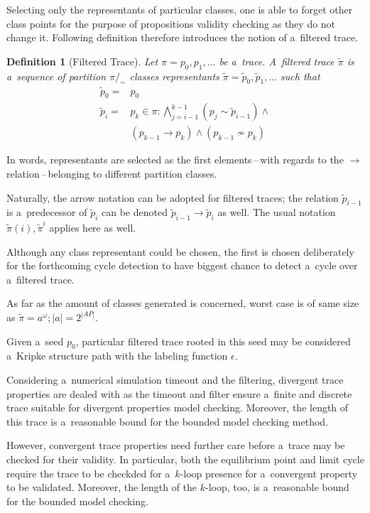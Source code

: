 \documentclass[12pt,twoside,draft]{fithesis}
\newtheorem{mydef}{Definition}
\begin{document}
Selecting only the representants of particular classes, one is able to
forget other class points for the purpose of propositions validity
checking as they do not change it. Following definition therefore
introduces the notion of a~filtered trace.
\begin{mydef}[Filtered Trace] Let $\pi=p_0,p_1,\dotsc$ be a~trace.
A~filtered trace $\tilde{\pi}$ is a~sequence of partition
$\pi/_{\sim}$ classes representants
$\tilde{\pi}=\tilde{p}_0,\tilde{p}_1,\dotsc$ such that
\begin{align}
\tilde{p}_{0}=&p_0\\
\tilde{p}_{i}=&p_k\in\pi:\bigwedge_{j=i-1}^{k-1}\left(
	p_j\sim \tilde{p}_{i-1}\right)
	\wedge\nonumber\\
	&(p_{k-1}\rightarrow p_{k})\wedge(p_{k-1}\not\sim p_{k})
\end{align}
\end{mydef}
In words, representants are selected as the first elements\,--\,with
regards to the $\rightarrow$ relation\,--\,belonging to different
partition classes. 

Naturally, the arrow notation can be adopted for filtered traces;
the relation $\tilde{p}_{i-1}$ is a~predecessor of $\tilde{p}_{i}$ can
be denoted $\tilde{p}_{i-1}\rightarrow\tilde{p}_{i}$ as well. The usual
notation $\tilde{\pi}(i),\tilde{\pi}^i$ applies here as well.

Although any class representant could be chosen, the first is chosen
deliberately for the forthcoming cycle detection to have biggest chance
to detect a~cycle over a~filtered trace.

As far as the amount of classes generated is concerned, worst case is
of same size as $\tilde{\pi}=a^\omega; |a|=2^{|AP|}$.

Given a~seed $p_0$, particular filtered trace rooted in this seed may be
considered a~Kripke structure path with the labeling function
$\epsilon$.

Considering a~numerical simulation timeout and the filtering,
divergent trace properties are dealed with as the timeout and filter
ensure a~finite and discrete trace suitable for divergent properties
model checking. Moreover, the length of this trace is a~reasonable bound
for the bounded model checking method\cite{biere}.

However, convergent trace properties need further care before a~trace
may be checked for their validity. In particular, both the equilibrium
point and limit cycle require the trace to be checkded for a~$k$-loop
presence for a~convergent property to be validated. Moreover, the length
of the $k$-loop, too, is a~reasonable bound for the bounded model
checking\cite{biere}.
\end{document}
